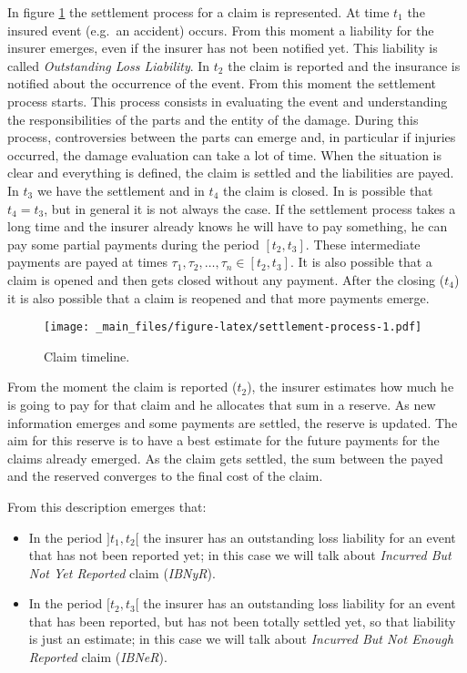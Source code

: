 \documentclass[a4paper, nobind]{templates/ociamthesis}
\providecommand{\tightlist}{%
  \setlength{\itemsep}{0pt}\setlength{\parskip}{0pt}}
\theoremstyle{definition}
\theoremstyle{definition}
\theoremstyle{definition}
\theoremstyle{remark}
\begin{document}
In figure \ref{fig:settlement-process} the settlement process for a claim is represented. At time \(t_1\) the insured event (e.g.~an accident) occurs. From this moment a liability for the insurer emerges, even if the insurer has not been notified yet. This liability is called \emph{Outstanding Loss Liability}. In \(t_2\) the claim is reported and the insurance is notified about the occurrence of the event. From this moment the settlement process starts. This process consists in evaluating the event and understanding the responsibilities of the parts and the entity of the damage. During this process, controversies between the parts can emerge and, in particular if injuries occurred, the damage evaluation can take a lot of time. When the situation is clear and everything is defined, the claim is settled and the liabilities are payed. In \(t_3\) we have the settlement and in \(t_4\) the claim is closed. In is possible that \(t_4=t_3\), but in general it is not always the case. If the settlement process takes a long time and the insurer already knows he will have to pay something, he can pay some partial payments during the period \([t_2, t_3]\). These intermediate payments are payed at times \(\tau_1, \tau_2, \dots, \tau_n \in [t_2, t_3]\). It is also possible that a claim is opened and then gets closed without any payment. After the closing (\(t_4\)) it is also possible that a claim is reopened and that more payments emerge.

\begin{figure}
\centering
\texttt{[image: \_main\_files/figure-latex/settlement-process-1.pdf]}
\caption{\label{fig:settlement-process}Claim timeline.}
\end{figure}

From the moment the claim is reported (\(t_2\)), the insurer estimates how much he is going to pay for that claim and he allocates that sum in a reserve. As new information emerges and some payments are settled, the reserve is updated. The aim for this reserve is to have a best estimate for the future payments for the claims already emerged. As the claim gets settled, the sum between the payed and the reserved converges to the final cost of the claim.

From this description emerges that:

\begin{itemize}
\tightlist
\item
  In the period \(]t_1, t_2[\) the insurer has an outstanding loss liability for an event that has not been reported yet; in this case we will talk about \emph{Incurred But Not Yet Reported} claim (\emph{IBNyR}).
\item
  In the period \([t_2, t_3[\) the insurer has an outstanding loss liability for an event that has been reported, but has not been totally settled yet, so that liability is just an estimate; in this case we will talk about \emph{Incurred But Not Enough Reported} claim (\emph{IBNeR}).
\end{itemize}
\end{document}
